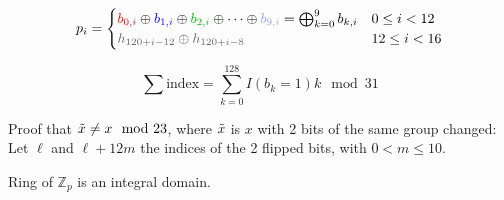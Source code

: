 \documentclass{article}
\begin{document}
\vspace{8pt}
\begin{equation*}
	p_i = \begin{cases} 
	    \textcolor{red}{b_{0,i}} \oplus \textcolor{blue}{b_{1,i}} \oplus \textcolor{green!70!black}{b_{2,i}} \oplus \dots \oplus \textcolor{blue!40!white}{b_{9,i}} = \bigoplus_{k=0}^9 b_{k,i} & 0 \leq i < 12\\
	    \textcolor{white!40!black}{h_{120 + i - 12} \oplus h_{120 + i - 8}} & 12 \leq i < 16
	    \end{cases}
\end{equation*}

\vspace{8pt}
\def\palette{
    0/red/11111,1/blue/11110,2/green/11101,3/gray/11100,4/white/\vdots,5/orange/00011,6/yellow/00010,7/brown/00001,8/violet/00000}
\def\paletteshifted{
    0/green/11111,1/gray/11110,2/green!60!black/11101,3/pink/11100,4/white/\vdots,5/brown/00011,6/violet/00010,7/red/00001,8/blue/00000}
\def\maxy{8*1.5*\scl + 0.75*\scl}

$$\sum\text{index} = \sum\limits_{k=0}^{128}  I(b_k = 1)k \mod 31$$ 

\vspace{8pt}
Proof that $\Tilde{x} \neq x \mod 23$, where $\Tilde{x}$ is $x$ with 2 bits of the same group changed:
Let $\ell$ and $\ell+12m$ the indices of the 2 flipped bits, with $0 < m \leq 10$.

Ring of $\mathbb Z_p$ is an integral domain.
\end{document}

